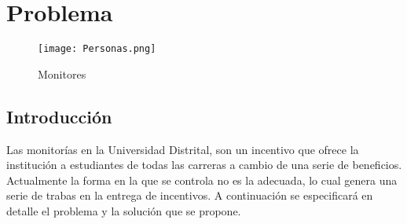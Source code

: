 \chapter{Problema}
\begin{figure}[th!]
	\centering
	\texttt{[image: Personas.png]}
    \caption{Monitores}
	\label{fig:Monitores}
\end{figure}

\section{Introducción}

Las monitorías en la Universidad Distrital, son un incentivo que ofrece la institución a estudiantes de todas
las carreras a cambio de una serie de beneficios. Actualmente la forma en la que se controla no es la adecuada, lo cual genera una serie de trabas en la entrega de incentivos. A continuación se especificará en detalle el problema y la solución que se propone.

\newpage
